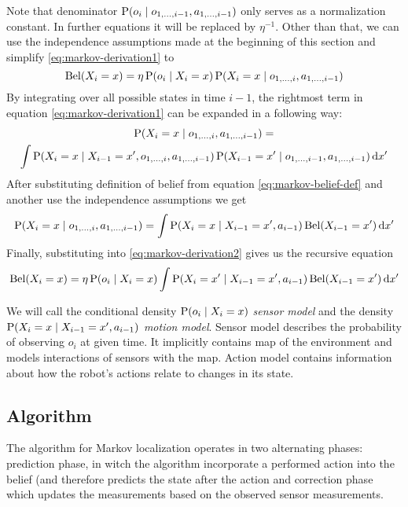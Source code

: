 Note that denominator \(\operatorname{\mathrm{P}}(o_i \mid o_{1, \dotsc, i-1}, a_{1, \dotsc, i-1})\) only
serves as a normalization constant.
In further equations it will be replaced by \(\eta^{-1}\).
Other than that, we can use the independence assumptions made at the beginning
of this section and simplify \eqref{eq:markov-derivation1} to
\begin{equation}
	\label{eq:markov-derivation2}
	\operatorname{\mathrm{Bel}}(X_i = x) =
		\eta \operatorname{\mathrm{P}}(o_i \mid X_i = x)
		\operatorname{\mathrm{P}}(X_i = x \mid o_{1, \dotsc, i}, a_{1, \dotsc, i - 1})
\end{equation}
By integrating over all possible states in time \(i - 1\), the rightmost term in
equation \eqref{eq:markov-derivation1} can be expanded in a following way:
\begin{multline}
	\label{eq:markov-derivation3}
	\operatorname{\mathrm{P}}(X_i = x \mid o_{1, \dotsc, i}, a_{1, \dotsc, i - 1}) = \\
	\int
	\operatorname{\mathrm{P}}(X_i = x \mid X_{i - 1}=x', o_{1, \dotsc, i}, a_{1, \dotsc, i - 1})
	\operatorname{\mathrm{P}}(X_{i-1} = x' \mid o_{1, \dotsc, i-1}, a_{1, \dotsc, i-1})
	\,\mathrm{d}x'
\end{multline}
After substituting definition of belief from equation \eqref{eq:markov-belief-def}
and another use the independence assumptions we get
\begin{equation}
	\label{eq:markov-derivation4}
	\operatorname{\mathrm{P}}(X_i = x \mid o_{1, \dotsc, i}, a_{1, \dotsc, i - 1}) =
	\int
	\operatorname{\mathrm{P}}(X_i = x \mid X_{i - 1}=x', a_{i - 1})
	\operatorname{\mathrm{Bel}}(X_{i-1} = x')
	\,\mathrm{d}x'
\end{equation}
Finally, substituting into \eqref{eq:markov-derivation2} gives us the recursive
equation
\begin{equation}
	\label{eq:markov-final}
	\operatorname{\mathrm{Bel}}(X_i = x) =
	\eta \operatorname{\mathrm{P}}(o_i \mid X_i = x)
		\int
		\operatorname{\mathrm{P}}(X_i = x' \mid X_{i - 1}=x', a_{i - 1})
		\operatorname{\mathrm{Bel}}(X_{i-1} = x')
		\,\mathrm{d}x'
\end{equation}

We will call the conditional density \(\operatorname{\mathrm{P}}(o_i \mid X_i = x)\) \emph{sensor model} and
the density \(\operatorname{\mathrm{P}}(X_i = x \mid X_{i - 1}=x', a_{i - 1})\) \emph{motion model}.
Sensor model describes the probability of observing \(o_i\) at given time.
It implicitly contains map of the environment and models interactions of sensors with
the map.
Action model contains information about how the robot's actions relate to changes in its state.

\subsection{Algorithm}
The algorithm for Markov localization operates in two alternating phases:
prediction phase, in witch the algorithm incorporate a performed action into the belief
(and therefore predicts the state after the action and correction phase which updates
the measurements based on the observed sensor measurements.

